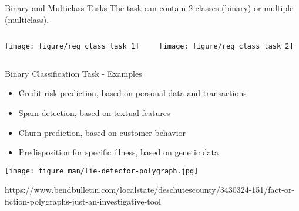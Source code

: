 \documentclass[11pt,compress,t,notes=noshow, xcolor=table]{beamer}
\begin{document}
\begin{vbframe}{Binary and Multiclass Tasks}
The task can contain 2 classes (binary) or multiple (multiclass).
\begin{columns}[T]
  \begin{column}{0.5\textwidth}
\begin{knitrout}\scriptsize
{}\color{fgcolor}

{\centering \texttt{[image: figure/reg\_class\_task\_1]}

}



\end{knitrout}
  \end{column}
  \begin{column}{0.5\textwidth}
\begin{knitrout}\scriptsize
{}\color{fgcolor}

{\centering \texttt{[image: figure/reg\_class\_task\_2]}

}



\end{knitrout}
  \end{column}
\end{columns}
\end{vbframe}


\begin{vbframe}{Binary Classification Task - Examples}

  \begin{itemize}
  \item Credit risk prediction, based on personal data and transactions
  \item Spam detection, based on textual features
  \item Churn prediction, based on customer behavior
  \item Predisposition for specific illness, based on genetic data
\end{itemize}

\begin{center}
  \texttt{[image: figure\_man/lie-detector-polygraph.jpg]}
\end{center}
\vspace{-0.6cm}
\begin{flushright}
  \tiny https://www.bendbulletin.com/localstate/deschutescounty/3430324-151/fact-or-fiction-polygraphs-just-an-investigative-tool
\end{flushright}
\end{vbframe}
\end{document}
